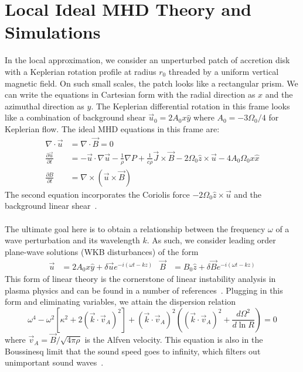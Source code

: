\section{Local Ideal MHD Theory and Simulations} \label{sec:localideal}
In the local approximation, we consider an unperturbed patch of accretion disk with a Keplerian rotation profile at radius $r_0$ threaded by a uniform vertical magnetic field. On such small scales, the patch looks like a rectangular prism. We can write the equations in Cartesian form with the radial direction as $x$ and the azimuthal direction as $y$. The Keplerian differential rotation in this frame looks like a combination of background shear $\vec u_0=2A_0x\hat y$ where $A_0=-3\Omega_0/4$ for Keplerian flow. The ideal MHD equations in this frame are:
\begin{align}
  \nabla\cdot\vec u&=\nabla\cdot\vec B=0\\
  \frac{\partial\vec u}{\partial t}&=-\vec u\cdot\nabla\vec u-\frac1\rho\nabla P+\frac{1}{c\rho}\vec J\times\vec B-2\Omega_0\hat z\times\vec u-4A_0\Omega_0x\hat x\\
  \frac{\partial B}{\partial t}&=\nabla\times\left(\vec u\times\vec B\right)
\end{align}
The second equation incorporates the Coriolis force $-2\Omega_0\hat z\times\vec u$ and the background linear shear~\cite{AST521HW4}. \\
\\
The ultimate goal here is to obtain a relationship between the frequency $\omega$ of a wave perturbation and its wavelength $k$. As such, we consider leading order plane-wave solutions (WKB disturbances) of the form
\begin{align*}
  \vec u&=2A_0x\hat y+\delta\vec ue^{-i(\omega t-kz)} &  \vec B&=B_0\hat z+\delta\vec Be^{-i(\omega t-kz)}
\end{align*}
This form of linear theory is the cornerstone of linear instability analysis in plasma physics and can be found in a number of references~\cite{AST521HW4,BH1998,BH1991a,BH1991b,BH1991c,Quataert2008}. Plugging in this form and eliminating variables, we attain the dispersion relation
\begin{equation}
  \omega^4-\omega^2[\kappa^2+2(\vec k\cdot \vec v_A)^2]+(\vec k\cdot\vec v_A)^2\left((\vec k\cdot \vec v_A)^2+\frac{d\Omega^2}{d\ln R}\right)=0\label{eq:idealdispersion}
\end{equation}
where $\vec v_A=\vec B/\sqrt{4\pi\rho}$ is the Alfven velocity. This equation is also in the Boussinesq limit that the sound speed goes to infinity, which filters out unimportant sound waves~\cite{BH1998,KunzBoussinesq}. 

